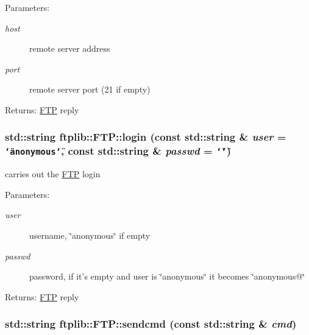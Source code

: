 \begin{Desc}
\item[Parameters:]
\begin{description}
\item[{\em host}]remote server address \item[{\em port}]remote server port (21 if empty) \end{description}
\end{Desc}
\begin{Desc}
\item[Returns:]\hyperlink{classftplib_1_1FTP}{FTP} reply \end{Desc}
\hypertarget{classftplib_1_1FTP_dc39751d00808d35183fb19c483b3589}{
\subsubsection{\setlength{\rightskip}{0pt plus 5cm}std::string ftplib::FTP::login (const std::string \& {\em user} = {\tt \char`\"{}anonymous\char`\"{}}, \/  const std::string \& {\em passwd} = {\tt \char`\"{}\char`\"{}})}}
\label{classftplib_1_1FTP_dc39751d00808d35183fb19c483b3589}


carries out the \hyperlink{classftplib_1_1FTP}{FTP} login 

\begin{Desc}
\item[Parameters:]
\begin{description}
\item[{\em user}]username, \char`\"{}anonymous\char`\"{} if empty \item[{\em passwd}]password, if it's empty and user is \char`\"{}anonymous\char`\"{} it becomes \char`\"{}anonymous@\char`\"{} \end{description}
\end{Desc}
\begin{Desc}
\item[Returns:]\hyperlink{classftplib_1_1FTP}{FTP} reply \end{Desc}
\hypertarget{classftplib_1_1FTP_5a876d670107df4b5924238450440eee}{
\subsubsection{\setlength{\rightskip}{0pt plus 5cm}std::string ftplib::FTP::sendcmd (const std::string \& {\em cmd})}}
\label{classftplib_1_1FTP_5a876d670107df4b5924238450440eee}


